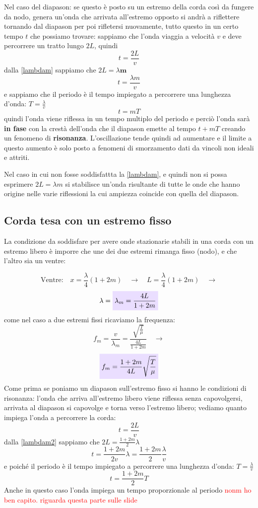 \documentclass[x11names]{report}
\newcommand{\viola}[1]{\colorbox{yred}{$\displaystyle #1$}}
\begin{document}
		
		Nel caso del diapason: se questo è posto su un estremo della corda così da fungere da nodo, genera un'onda che arrivata all'estremo opposto si andrà a riflettere tornando dal diapason per poi rifletersi nuovamente, tutto questo in un certo tempo \(t\) che possiamo trovare: sappiamo che l'onda viaggia a velocità \(v\) e deve percorrere un tratto lungo \(2L\), quindi 
		\[ 
		t = \frac{2L}{v}
		\]
		dalla \ref{lambdam} sappiamo che \(2L = \lambda \boldsymbol{m}\)
		\[ 
		t = \frac{\lambda m}{v}
		\]
		e sappiamo che il periodo è il tempo impiegato a percorrere una lunghezza d'onda: \(T = \frac{\lambda}{v}\)
		\[ 
		t = mT
		\]
		quindi l'onda viene riflessa in un tempo multiplo del periodo e perciò l'onda sarà \textbf{in fase} con la crestà dell'onda che il diapason emette al tempo \(t + mT\) creando un fenomeno di \textbf{risonanza}. L'oscillazione tende quindi ad aumentare e il limite a questo aumento è solo posto a fenomeni di smorzamento dati da vincoli non ideali e attriti.
		
		Nel caso in cui non fosse soddisfattta la \ref{lambdam}, e quindi non si possa esprimere \(2L = \lambda m\) si stabilisce un'onda risultante di tutte le onde che hanno origine nelle varie riflessioni la cui ampiezza coincide con quella del diapason.
		
		\subsection{Corda tesa con un estremo fisso}
		La condizione da soddisfare per avere onde stazionarie stabili in una corda con un estremo libero è imporre che une dei due estremi rimanga fisso (nodo), e che l'altro sia un ventre:
		
		\[ 
		\text{Ventre:} \quad x = \frac{\lambda}{4}(1+2m) \quad \to \quad L = \frac{\lambda}{4}(1+2m) \quad \to 
		\]
		\begin{equation}\label{lambdam2}
			\lambda = \viola{\lambda_m  = \frac{4L}{1+2m}}
		\end{equation}
		come nel caso a due estremi fissi ricaviamo la frequenza:
		\[ 
		f_m = \frac{v}{\lambda_m} = \frac{\sqrt{\frac{T}{\mu}}}{\frac{4L}{1+2m}} \quad \to
		\]
		\begin{equation}
			\viola{f_m = \frac{1 + 2m}{4L} \sqrt{\frac{T}{\mu}}}
		\end{equation}
		Come prima se poniamo un diapason sull'estremo fisso si hanno le condizioni di risonanza: l'onda che arriva all'estremo libero viene riflessa senza capovolgersi, arrivata al diapason si capovolge e torna verso l'estremo libero; vediamo quanto impiega l'onda a percorrere la corda:
		\[ 
		t = \frac{2L}{v}
		\]
		dalla \ref{lambdam2} sappiamo che \(2L = \frac{1+2m}{2}\lambda\)
		\[ 
		t = \frac{1+2m}{2v}\lambda = \frac{1+2m}{2}\frac{\lambda}{v}
		\]
		e poiché il periodo è il tempo impiegato a percorrere una lunghezza d'onda: \(T=\frac{\lambda}{v}\)
		\[ 
		t = \frac{1+2m}{2}T
		\]
		Anche in questo caso l'onda impiega un tempo proporzionale al periodo \textcolor{red}{nonm ho ben capito. riguarda questa parte sulle slide}
		
\end{document}
